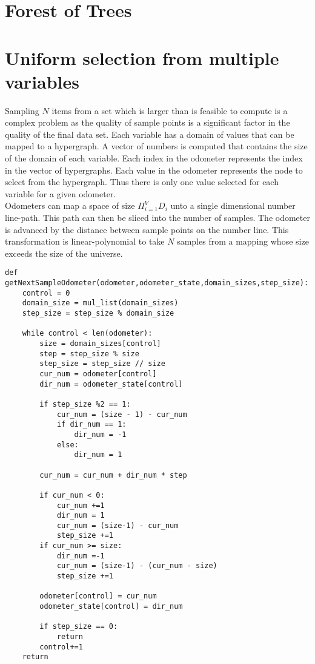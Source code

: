 \newpage


\section{Forest of Trees}
\section{Uniform selection from multiple variables}
Sampling $N$ items from a set which is larger than is feasible to compute is a complex problem as the quality of sample points is a significant factor in the quality of the final data set. Each variable has a domain of values that can be mapped to a hypergraph. A vector of numbers is computed that contains the size of the domain of each variable. Each index in the odometer represents the index in the vector of hypergraphs. Each value in the odometer represents the node to select from the hypergraph. Thus there is only one value selected for each variable for a given odometer. \\

Odometers can map a space of size ${\Pi_{i=1}^{V} D_i}$ unto a single dimensional number line-path. This path can then be sliced into the number of samples. The odometer is advanced by the distance between sample points on the number line. This transformation is linear-polynomial to take $N$ samples from a mapping whose size exceeds the size of the universe. 
\newpage

\begin{lstlisting}
def getNextSampleOdometer(odometer,odometer_state,domain_sizes,step_size):
    control = 0
    domain_size = mul_list(domain_sizes)
    step_size = step_size % domain_size

    while control < len(odometer):
        size = domain_sizes[control]
        step = step_size % size
        step_size = step_size // size
        cur_num = odometer[control]
        dir_num = odometer_state[control]

        if step_size %2 == 1:
            cur_num = (size - 1) - cur_num
            if dir_num == 1:
                dir_num = -1
            else:
                dir_num = 1

        cur_num = cur_num + dir_num * step

        if cur_num < 0:
            cur_num +=1
            dir_num = 1
            cur_num = (size-1) - cur_num
            step_size +=1
        if cur_num >= size:
            dir_num =-1
            cur_num = (size-1) - (cur_num - size)
            step_size +=1

        odometer[control] = cur_num
        odometer_state[control] = dir_num

        if step_size == 0:
            return
        control+=1
    return
\end{lstlisting}
\newpage
